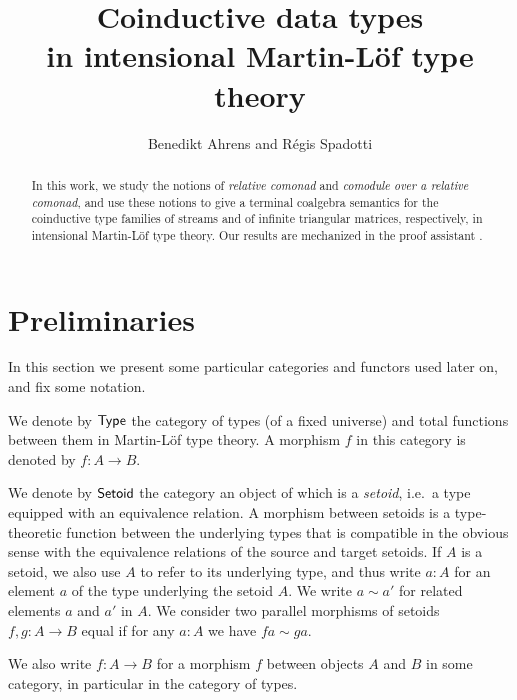 \documentclass[envcountsame]{llncs}
\begin{document}
\title{Coinductive data types\\in intensional Martin-L\"of type theory}

\author{Benedikt Ahrens and R\'egis Spadotti}


\newcommand{\fat}[1]{\textbf{#1}}





\maketitle


\begin{abstract}


 In this work, we study the notions of \emph{relative comonad} and \emph{comodule over a relative comonad}, and  
 use these notions to give a terminal coalgebra semantics for the coinductive type families of streams and
 of infinite triangular matrices, respectively, in intensional Martin-L\"of type theory.
 Our results are mechanized in the proof assistant \coq.
   
  
  \end{abstract}




 


\section{Preliminaries}\label{sec:preliminaries}

In this section we present some particular categories and functors used later on, and fix some notation.


\begin{definition}\label{def:set_setoid}
 We denote by $\mathsf{Type}$ the category of types (of a fixed universe) and total functions between them in Martin-L\"of type theory. 
 A morphism $f$ in this category is denoted by $f : A \to B$.
 
 We denote by $\mathsf{Setoid}$ the category an object of which is a \emph{setoid}, i.e.\ a type equipped with an equivalence relation.
 A morphism between setoids is a type-theoretic function between the underlying types that is compatible in the obvious sense with the equivalence relations of the source and target setoids.
 If $A$ is a setoid, we also use $A$ to refer to its underlying type, and thus write $a:A$ for an element $a$ of the type underlying the setoid $A$. 
 We write $a\sim a'$ for related elements $a$ and $a'$ in $A$.
 We consider two parallel morphisms of setoids $f,g:A\to B$ equal if for any $a:A$ we have $fa \sim ga$.
 
 We also write $f:A\to B$ for a morphism $f$ between objects $A$ and $B$ in some category, in particular in the category of types.
 \end{definition}
\end{document}
